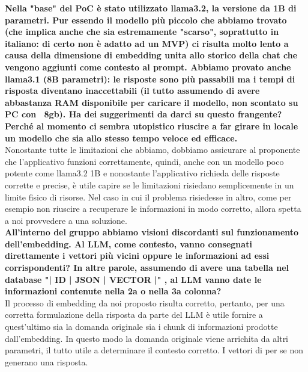\begin{itemize}
      \textbf{Nella "base" del PoC è stato utilizzato llama3.2, la versione da 1B di parametri. Pur essendo il modello più piccolo che abbiamo trovato (che implica anche che sia estremamente "scarso", soprattutto in italiano: di certo non è adatto ad un MVP) ci risulta molto lento a causa della dimensione di embedding unita allo storico della chat che vengono aggiunti come contesto al prompt. Abbiamo provato anche llama3.1 (8B parametri): le risposte sono più passabili ma i tempi di risposta diventano inaccettabili (il tutto assumendo di avere abbastanza RAM disponibile per caricare il modello, non scontato su PC con ~8gb). Ha dei suggerimenti da darci su questo frangente? Perché al momento ci sembra utopistico riuscire a far girare in locale un modello che sia allo stesso tempo veloce ed efficace.}\\
      Nonostante tutte le limitazioni che abbiamo, dobbiamo assicurare al proponente che l'applicativo funzioni correttamente, quindi, anche con un modello poco potente come llama3.2 1B e nonostante l'applicativo richieda delle risposte corrette e precise, è utile capire se le limitazioni risiedano semplicemente in un limite fisico di risorse. Nel caso in cui il problema risiedesse in altro, come per esempio non riuscire a recuperare le informazioni in modo corretto, allora spetta a noi provvedere a una soluzione.\\
      
      \textbf{All'interno del gruppo abbiamo visioni discordanti sul funzionamento dell'embedding. Al LLM, come contesto, vanno consegnati direttamente i vettori più vicini oppure le informazioni ad essi corrispondenti? In altre parole, assumendo di avere una tabella nel database "| ID | JSON | VECTOR |" , al LLM vanno date le informazioni contenute nella 2a o nella 3a colonna?}\\
      Il processo di embedding da noi proposto risulta corretto, pertanto, per una corretta formulazione della risposta da parte del LLM è utile fornire a quest'ultimo sia la domanda originale sia i chunk di informazioni prodotte dall'embedding. In questo modo la domanda originale viene arrichita da altri parametri, il tutto utile a determinare il contesto corretto. I vettori di per se non generano una risposta.\\

\end{itemize}